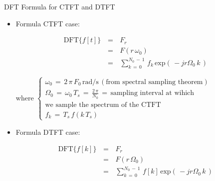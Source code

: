 \begin{frame}[t,allowframebreaks]{DFT Formula for CTFT and DTFT}

\begin{minipage}{\textwidth}


\begin{itemize}

\item Formula CTFT case:

\begin{equation}
\begin{array}{rcl}
\text{DFT}\{f[t]\} \, &=&\, F_r \\
						&=& \, F(r \, \omega_0) \\
					   &=&\, \displaystyle\sum_{k \, = \, 0}^{N_0 \, - \, 1} \, f_k \, \text{exp} \left(\, -j r \Omega_0 \, k   \,\right)
\end{array}
\end{equation}

where $\begin{cases}

\omega_0 \, = \, 2 \, \pi \, F_0 \, \text{rad/s} \, (\text{from spectral sampling theorem}) \\
\Omega_0 \, = \, \omega_0 \, T_s \, = \,   \displaystyle\frac{2 \, \pi}{N_0} \, = \, \text{sampling interval at wihich } \\
\text{we sample the spectrum of the CTFT} \\
f_k \, = \, T_s \, f(k \, T_s)
\end{cases}$ 


\end{itemize}


\end{minipage}


\begin{minipage}{\textwidth}


\begin{itemize}



\item Formula DTFT case:

\begin{equation}
\begin{array}{rcl}
\text{DFT}\{f[k]\} \, &=&\, F_r \\
						&=& \, F(r \, \Omega_0) \\
					   &=&\, \displaystyle\sum_{k \, = \, 0}^{N_0 \, - \, 1} \, f[k] \, \text{exp} \left(\, -j r \Omega_0 \, k   \,\right)
\end{array}
\label{Eq:DFT:dft_for_dtft}
\end{equation}


\end{itemize}
\end{minipage}
\end{frame}
